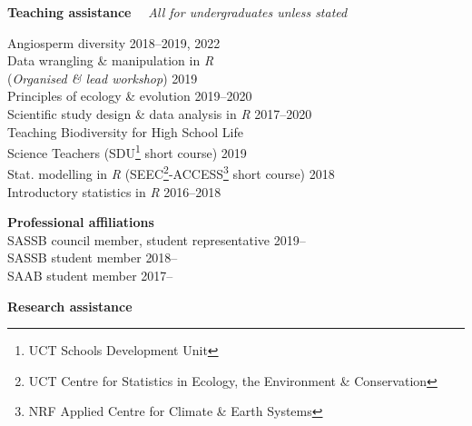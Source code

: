 \documentclass[10pt]{article}
\begin{document}
\begin{multicols}{2}
\columnbreak

\textbf{Teaching assistance} %
  ~~{\small \textmd{\textit{All for undergraduates unless stated}}}

Angiosperm diversity                         \hfill {\small 2018--2019, 2022} \\
Data wrangling \& manipulation in \textit{R}                                  \\
\hspace{2em} (\textit{Organised \& lead
  workshop})                                 \hfill {\small             2019} \\
Principles of ecology \& evolution           \hfill {\small       2019--2020} \\
Scientific study design \& data analysis in
  \textit{R}                                 \hfill {\small       2017--2020} \\
Teaching Biodiversity for High School Life                                    \\
\hspace{2em} Science Teachers {\small
  (SDU\footnote{UCT Schools Development Unit}
  short course)}                             \hfill {\small             2019} \\
Stat. modelling in \textit{R} {\small
  (SEEC\footnote{UCT Centre for Statistics in
  Ecology, the Environment \&
  Conservation}-ACCESS\footnote{NRF Applied
  Centre for Climate \& Earth Systems} short
  course)}                                   \hfill {\small             2018} \\
Introductory statistics in \textit{R}        \hfill {\small       2016--2018}

\textbf{Professional affiliations}\\ %

SASSB council member, student representative           \hfill {\small 2019--} \\
SASSB student member                                   \hfill {\small 2018--} \\
SAAB student member                                    \hfill {\small 2017--}

\end{multicols}

\textbf{Research assistance} %
\end{document}
